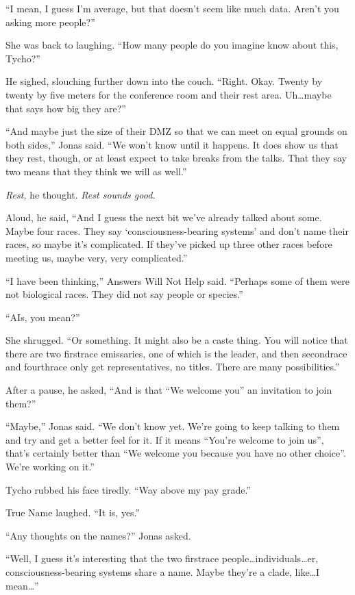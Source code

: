 ``I mean, I guess I'm average, but that doesn't seem like much data. Aren't you asking more people?''

She was back to laughing. ``How many people do you imagine know about this, Tycho?''

He sighed, slouching further down into the couch. ``Right. Okay. Twenty by twenty by five meters for the conference room and their rest area. Uh\ldots maybe that says how big they are?''

``And maybe just the size of their DMZ so that we can meet on equal grounds on both sides,'' Jonas said. ``We won't know until it happens. It does show us that they rest, though, or at least expect to take breaks from the talks. That they say two means that they think we will as well.''

\emph{Rest,} he thought. \emph{Rest sounds good.}

Aloud, he said, ``And I guess the next bit we've already talked about some. Maybe four races. They say `consciousness-bearing systems' and don't name their races, so maybe it's complicated. If they've picked up three other races before meeting us, maybe very, very complicated.''

``I have been thinking,'' Answers Will Not Help said. ``Perhaps some of them were not biological races. They did not say people or species.''

``AIs, you mean?''

She shrugged. ``Or something. It might also be a caste thing. You will notice that there are two firstrace emissaries, one of which is the leader, and then secondrace and fourthrace only get representatives, no titles. There are many possibilities.''

After a pause, he asked, ``And is that ``We welcome you'' an invitation to join them?''

``Maybe,'' Jonas said. ``We don't know yet. We're going to keep talking to them and try and get a better feel for it. If it means ``You're welcome to join us'', that's certainly better than ``We welcome you because you have no other choice''. We're working on it.''

Tycho rubbed his face tiredly. ``Way above my pay grade.''

True Name laughed. ``It is, yes.''

``Any thoughts on the names?'' Jonas asked.

``Well, I guess it's interesting that the two firstrace people\ldots individuals\ldots er, consciousness-bearing systems share a name. Maybe they're a clade, like\ldots I mean\ldots{}''

